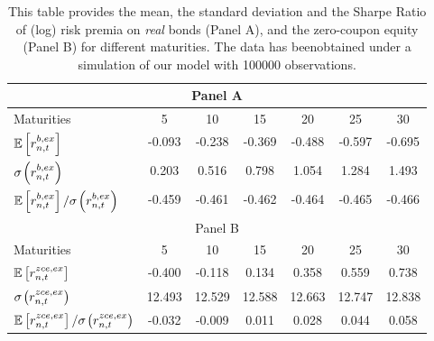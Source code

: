 \begin{table}[h!] \small
\captionsetup{font=small, width=0.8\textwidth}
\caption{This table provides the mean, the standard deviation and the Sharpe Ratio of (log) risk premia on \emph{real} bonds (Panel A), and the zero-coupon equity (Panel B) for different maturities. The data has beenobtained under a simulation of our model with 100000 observations.} \label{tab:tab49} \vspace{0.25cm}
\centering
\def\arraystretch{1.1}
\begin{tabular}{l|cccccc}
\hline\hline
\multicolumn{7}{c}{Panel A} \\\hline\hline
Maturities&5 &10 &15 &20 &25 &30 \\
\hline
$\mathbb{E}\left[r_{n,t}^{b,ex}\right]$&-0.093 &-0.238 &-0.369 &-0.488 &-0.597 &-0.695 \\
$\sigma\hspace{-0.02cm}\left(r_{n,t}^{b,ex}\right)$&0.203 &0.516 &0.798 &1.054 &1.284 &1.493 \\
$\E\left[r_{n,t}^{b,ex}\right]/\sigma\hspace{-0.02cm}\left(r_{n,t}^{b,ex}\right)$&-0.459 &-0.461 &-0.462 &-0.464 &-0.465 &-0.466 \\
\hline\hline
\multicolumn{7}{c}{Panel B} \\\hline\hline
Maturities&5 &10 &15 &20 &25 &30 \\
\hline
$\mathbb{E}\left[r_{n,t}^{zce,ex}\right]$&-0.400 &-0.118 &0.134 &0.358 &0.559 &0.738 \\
$\sigma\hspace{-0.02cm}\left(r_{n,t}^{zce,ex}\right)$&12.493 &12.529 &12.588 &12.663 &12.747 &12.838 \\
$\E\left[r_{n,t}^{zce,ex}\right]/\sigma\hspace{-0.02cm}\left(r_{n,t}^{zce,ex}\right)$&-0.032 &-0.009 &0.011 &0.028 &0.044 &0.058 \\
\hline
\hline
\end{tabular}
\end{table}
